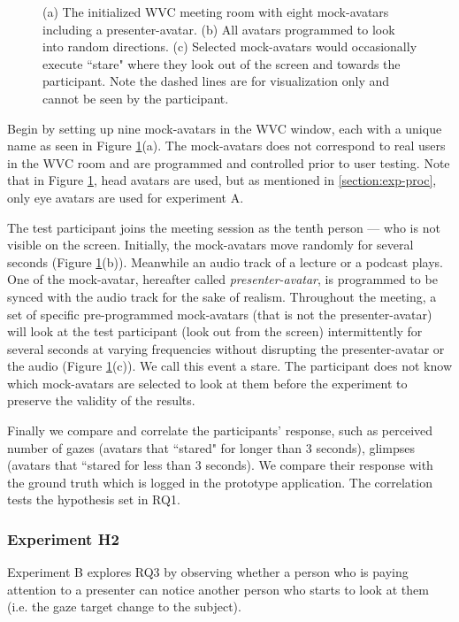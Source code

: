 \begin{figure}
\begin{subfigure}[b]{0.3\textwidth}
         \caption{}
     \end{subfigure}
    \caption{(a) The initialized WVC meeting room with eight mock-avatars including a presenter-avatar. (b) All avatars programmed to look into random directions. (c) Selected mock-avatars would occasionally execute ``stare" where they look out of the screen and towards the participant. Note the dashed lines are for visualization only and cannot be seen by the participant.}
    \label{fig:expa}
\end{figure}

Begin by setting up nine mock-avatars in the WVC window, each with a unique name as seen in Figure \ref{fig:expa}(a). The mock-avatars does not correspond to real users in the WVC room and are programmed and controlled prior to user testing. Note that in Figure \ref{fig:expa}, head avatars are used, but as mentioned in \ref{section:exp-proc}, only eye avatars are used for experiment A.

The test participant joins the meeting session as the tenth person --- who is not visible on the screen. Initially, the mock-avatars move randomly for several seconds (Figure \ref{fig:expa}(b)). Meanwhile an audio track of a lecture or a podcast plays.
One of the mock-avatar, hereafter called \textit{presenter-avatar}, is programmed to be synced with the audio track for the sake of realism.
Throughout the meeting, a set of specific pre-programmed mock-avatars (that is not the presenter-avatar) will look at the test participant (look out from the screen) intermittently for several seconds at varying frequencies without disrupting the presenter-avatar or the audio (Figure \ref{fig:expa}(c)). We call this event a stare. The participant does not know which mock-avatars are selected to look at them before the experiment to preserve the validity of the results.

Finally we compare and correlate the participants’ response, such as perceived number of gazes
(avatars that ``stared" for longer than 3 seconds), glimpses (avatars that ``stared for less than 3 seconds). We compare their response with the ground truth which is logged in the prototype application. The correlation tests the hypothesis set in RQ1.

\subsubsection{Experiment H2}

Experiment B explores RQ3 by observing whether a person who is paying attention to a presenter can notice another person who starts to look at them (i.e. the gaze target change to the subject).

